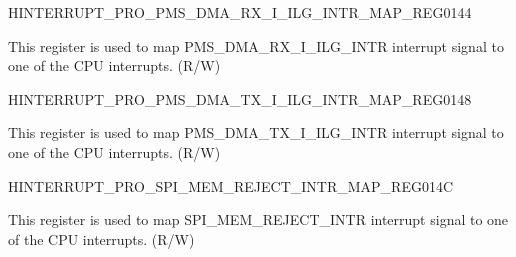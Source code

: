 \begin{register}{H}{INTERRUPT\_PRO\_PMS\_DMA\_RX\_I\_ILG\_INTR\_MAP\_REG}{\hexprefix{}0144}\label{regdesc:INTERRUPTPROPMSDMARXIILGINTRMAPREG}
%
%
\regnewline%
\begin{regdesc}\begin{reglist}
\label{fielddesc:INTERRUPTPROPMSDMARXIILGINTRMAP}\item [INTERRUPT\_PRO\_PMS\_DMA\_RX\_I\_ILG\_INTR\_MAP] This register is used to map PMS\_DMA\_RX\_I\_ILG\_INTR interrupt signal to one of the CPU interrupts. (R/W)
\end{reglist}\end{regdesc}
\end{register}


\begin{register}{H}{INTERRUPT\_PRO\_PMS\_DMA\_TX\_I\_ILG\_INTR\_MAP\_REG}{\hexprefix{}0148}\label{regdesc:INTERRUPTPROPMSDMATXIILGINTRMAPREG}
%
%
\regnewline%
\begin{regdesc}\begin{reglist}
\label{fielddesc:INTERRUPTPROPMSDMATXIILGINTRMAP}\item [INTERRUPT\_PRO\_PMS\_DMA\_TX\_I\_ILG\_INTR\_MAP] This register is used to map PMS\_DMA\_TX\_I\_ILG\_INTR interrupt signal to one of the CPU interrupts. (R/W)
\end{reglist}\end{regdesc}
\end{register}


\begin{register}{H}{INTERRUPT\_PRO\_SPI\_MEM\_REJECT\_INTR\_MAP\_REG}{\hexprefix{}014C}\label{regdesc:INTERRUPTPROSPIMEMREJECTINTRMAPREG}
%
%
\regnewline%
\begin{regdesc}\begin{reglist}
\label{fielddesc:INTERRUPTPROSPIMEMREJECTINTRMAP}\item [INTERRUPT\_PRO\_SPI\_MEM\_REJECT\_INTR\_MAP] This register is used to map SPI\_MEM\_REJECT\_INTR interrupt signal to one of the CPU interrupts. (R/W)
\end{reglist}\end{regdesc}
\end{register}


